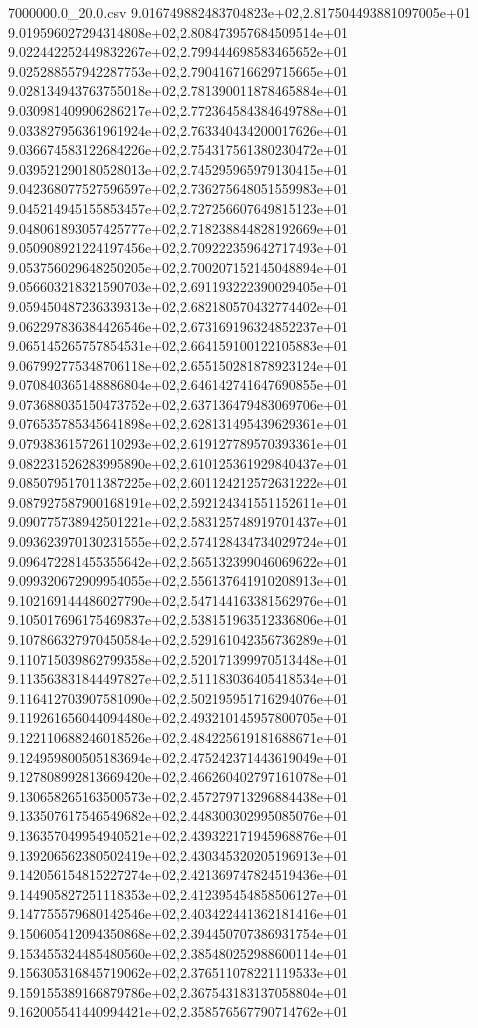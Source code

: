 \begin{filecontents*}{7000000.0_20.0.csv}
9.016749882483704823e+02,2.817504493881097005e+01
9.019596027294314808e+02,2.808473957684509514e+01
9.022442252449832267e+02,2.799444698583465652e+01
9.025288557942287753e+02,2.790416716629715665e+01
9.028134943763755018e+02,2.781390011878465884e+01
9.030981409906286217e+02,2.772364584384649788e+01
9.033827956361961924e+02,2.763340434200017626e+01
9.036674583122684226e+02,2.754317561380230472e+01
9.039521290180528013e+02,2.745295965979130415e+01
9.042368077527596597e+02,2.736275648051559983e+01
9.045214945155853457e+02,2.727256607649815123e+01
9.048061893057425777e+02,2.718238844828192669e+01
9.050908921224197456e+02,2.709222359642717493e+01
9.053756029648250205e+02,2.700207152145048894e+01
9.056603218321590703e+02,2.691193222390029405e+01
9.059450487236339313e+02,2.682180570432774402e+01
9.062297836384426546e+02,2.673169196324852237e+01
9.065145265757854531e+02,2.664159100122105883e+01
9.067992775348706118e+02,2.655150281878923124e+01
9.070840365148886804e+02,2.646142741647690855e+01
9.073688035150473752e+02,2.637136479483069706e+01
9.076535785345641898e+02,2.628131495439629361e+01
9.079383615726110293e+02,2.619127789570393361e+01
9.082231526283995890e+02,2.610125361929840437e+01
9.085079517011387225e+02,2.601124212572631222e+01
9.087927587900168191e+02,2.592124341551152611e+01
9.090775738942501221e+02,2.583125748919701437e+01
9.093623970130231555e+02,2.574128434734029724e+01
9.096472281455355642e+02,2.565132399046069622e+01
9.099320672909954055e+02,2.556137641910208913e+01
9.102169144486027790e+02,2.547144163381562976e+01
9.105017696175469837e+02,2.538151963512336806e+01
9.107866327970450584e+02,2.529161042356736289e+01
9.110715039862799358e+02,2.520171399970513448e+01
9.113563831844497827e+02,2.511183036405418534e+01
9.116412703907581090e+02,2.502195951716294076e+01
9.119261656044094480e+02,2.493210145957800705e+01
9.122110688246018526e+02,2.484225619181688671e+01
9.124959800505183694e+02,2.475242371443619049e+01
9.127808992813669420e+02,2.466260402797161078e+01
9.130658265163500573e+02,2.457279713296884438e+01
9.133507617546549682e+02,2.448300302995085076e+01
9.136357049954940521e+02,2.439322171945968876e+01
9.139206562380502419e+02,2.430345320205196913e+01
9.142056154815227274e+02,2.421369747824519436e+01
9.144905827251118353e+02,2.412395454858506127e+01
9.147755579680142546e+02,2.403422441362181416e+01
9.150605412094350868e+02,2.394450707386931754e+01
9.153455324485480560e+02,2.385480252988600114e+01
9.156305316845719062e+02,2.376511078221119533e+01
9.159155389166879786e+02,2.367543183137058804e+01
9.162005541440994421e+02,2.358576567790714762e+01

\end{filecontents*}
